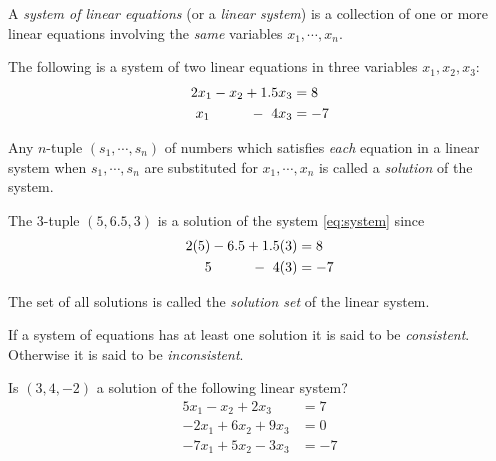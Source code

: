 \documentclass[12pt,letterpaper,reqno]{article}
\numberwithin{equation}{section}
\newcommand{\ti}[1]{\textit{#1}}
\begin{document}
\begin{defn}\label{eq:system_of_linear_equations}
	A \ti{system of linear equations} (or a \ti{linear system}) is a collection of one or more linear equations involving the \ti{same} variables $x_1, \cdots, x_n$.	
\end{defn}

\begin{example}
The following is a system of two linear equations in three variables $x_1,x_2,x_3$:
\begin{equation}\label{eq:system}
\begin{split}
	2x_1-x_2+1.5x_3&=8 \\
	x_1  \hspace{1.0cm} - \ 4x_3&=-7
\end{split}
\end{equation}	
\end{example}

\begin{defn}[Solution]\label{def:solution}
	Any $n$-tuple $(s_1,\cdots,s_n)$ of numbers which satisfies \ti{each} equation in a linear system when $s_1,\cdots,s_n$ are substituted for $x_1,\cdots,x_n$ is called a \ti{solution} of the system.
\end{defn}

\begin{example}
The 3-tuple $(5,6.5,3)$ is a solution of the system \eqref{eq:system} since
	\begin{equation*}
\begin{split}
	2(5)-6.5+1.5(3)&=8 \\
	5  \hspace{1.0cm} - \ 4(3)&=-7
\end{split}
\end{equation*}	
\end{example}

\begin{defn} \label{def:solution_set}
The set of all solutions is called the \ti{solution set} of the linear system.	
\end{defn}

\begin{defn}\label{def:consistent}
If a system of equations has at least one solution it is said to be \ti{consistent}. Otherwise it is said to be \ti{inconsistent}.	
\end{defn}

\begin{exercise}
Is $(3,4,-2)$ a solution of the following linear system?
\begin{align*}
	5x_1-x_2+2x_3 &=7 \\
	-2x_1+6x_2+9x_3&=0 \\
	-7x_1+5x_2-3x_3&=-7
\end{align*} 	
\end{exercise}
\end{document}
